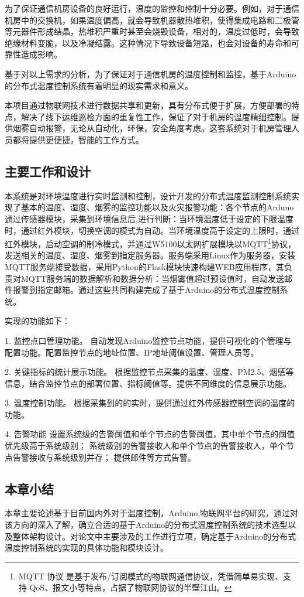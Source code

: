 为了保证通信机房设备的良好运行，温度的监控和控制十分必要。例如，对于通信机房中的交换机，如果温度偏高，就会导致机器散热堆积，使得集成电路和二极管等元器件形成结晶，热堆积严重时甚至会烧毁设备，相对的，温度过低时，会导致绝缘材料变脆，以及冷凝结露。这种情况下导致设备短路，也会对设备的寿命和可靠性造成影响。

基于对以上需求的分析，为了保证对于通信机房的温度控制和监控，基于Arduino的分布式温度控制系统有着明显的现实需求和意义。

本项目通过物联网技术进行数据共享和更新，具有分布式便于扩展，方便部署的特点，解决了线下运维巡检方面的重复性工作，保证了对于机房的温度精细控制。提供烟雾自动报警，无论从自动化，环保，安全角度考虑。这套系统对于机房管理人员都将提供更便捷，智能的工作方式。


\subsection{主要工作和设计}

本系统是对环境温度进行实时监测和控制，设计开发的分布式温度监测控制系统实现了基本的温度、湿度、烟雾的监控功能以及火灾报警功能：各个节点的Arduno通过传感器模块，采集到环境信息后,进行判断：当环境温度低于设定的下限温度时，通过红外模块，切换空调的模式为自动。当环境温度高于设定的上限时，通过红外模块，启动空调的制冷模式，并通过W5100以太网扩展模块以MQTT\footnote{MQTT 协议 是基于发布/订阅模式的物联网通信协议，凭借简单易实现、支持 QoS、报文小等特点，占据了物联网协议的半壁江山。}协议，发送相关的温度、湿度、烟雾到指定服务器。服务端采用Linux作为服务器，安装MQTT服务端接受数据，采用Python的Flask模块快速构建WEB应用程序，其负责对MQTT服务端的数据解析和数据分析：当烟雾值超过预设值时，自动发送邮件报警到指定邮箱。通过这些共同构建完成了基于Arduino的分布式温度控制系统。

实现的功能如下：

1. 监控点口管理功能。 自动发现Arduino监控节点功能，提供可视化的个管理与配置功能。配置监控节点的地址位置、IP地址阈值设置、管理人员等。

2. 关键指标的统计展示功能。 根据监控节点采集的温度、湿度、PM2.5、烟感等信息，结合监控节点的部署位置、指标阈值等。提供不同维度的信息展示功能。 

3. 温度控制功能。 根据采集到的的实时，提供通过红外传感器控制空调的温度的功能。 

4. 告警功能 设置系统级的告警阈值和单个节点的告警阈值，其中单个节点的阈值优先级高于系统级别； 系统级别的告警接收人和单个节点的告警接收人，单个节点告警接收与系统级别并存； 提供邮件等方式告警。

\subsection{本章小结}
本章主要论述基于目前国内外对于温度控制，Arduino,物联网平台的研究，通过对该方向的深入了解，确立合适的基于Arduino的分布式温度控制系统的技术选型以及整体架构设计。对论文中主要涉及的工作进行立项，确定基于Arduino的分布式温度控制系统的实现的具体功能和模块设计。